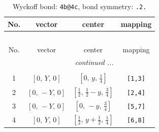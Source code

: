 \documentclass[fleqn,8pt]{jsarticle}
\begin{document}
\renewcommand{\arraystretch}{1.2}
\begin{longtable}{cccc}
\caption{Wyckoff bond: {\tt 4b@4c}, bond symmetry: {\tt .2.}}
 \\
 \hline \hline
No. & vector & center & mapping \\ \hline \endfirsthead

\multicolumn{3}{l}{\tablename\ \thetable{}} \\
 \hline \hline
No. & vector & center & mapping \\ \hline \endhead

 \hline \hline
\multicolumn{3}{r}{\footnotesize\it continued ...} \\ \endfoot

 \hline \hline
\multicolumn{3}{r}{} \\ \endlastfoot

1 & $\left[ 0,\, Y,\, 0 \right]$ & $\left[ 0,\, y,\, \frac{1}{4} \right]$ & {\tt [1,3]} \\ \hline
2 & $\left[ 0,\, - Y,\, 0 \right]$ & $\left[ \frac{1}{2},\, \frac{1}{2} - y,\, \frac{3}{4} \right]$ & {\tt [2,4]} \\ \hline
3 & $\left[ 0,\, - Y,\, 0 \right]$ & $\left[ 0,\, - y,\, \frac{3}{4} \right]$ & {\tt [5,7]} \\ \hline
4 & $\left[ 0,\, Y,\, 0 \right]$ & $\left[ \frac{1}{2},\, y + \frac{1}{2},\, \frac{1}{4} \right]$ & {\tt [6,8]} \\
\end{longtable}
\renewcommand{\arraystretch}{1.2}
\end{document}
